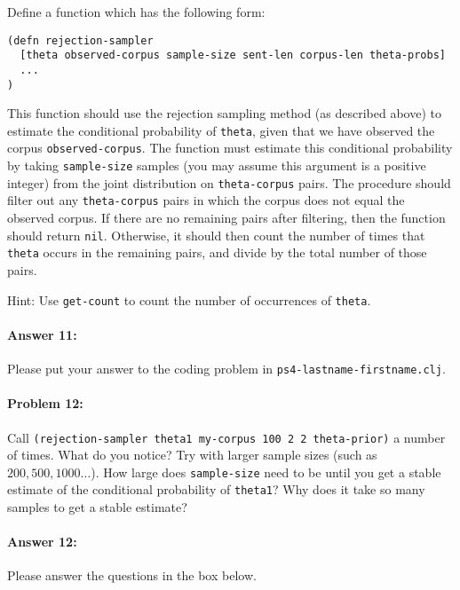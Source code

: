 \documentclass[10pt]{article}
\newcommand{\required}[1]{{\color{blue}{#1}}}
\newcommand{\PSnum}{4}
\begin{document}
 Define a function \required{\texttt{rejection-sampler}}
which has the following form:
 
\begin{lstlisting}
(defn rejection-sampler
  [theta observed-corpus sample-size sent-len corpus-len theta-probs]
  ...
)
\end{lstlisting}

 This function should use the rejection sampling method (as
described above) to estimate the conditional probability of
\texttt{theta}, given that we have observed the corpus
\texttt{observed-corpus}. The function must estimate this conditional
probability by taking \texttt{sample-size} samples (you may assume
this argument is a positive integer) from the joint distribution on
\texttt{theta-corpus} pairs. The procedure should filter out any
\texttt{theta-corpus} pairs in which the corpus does not equal the
observed corpus. If there are no remaining pairs after filtering, then 
the function should return \texttt{nil}. Otherwise,
it should then count the number of times that \texttt{theta} occurs in the remaining pairs,
and divide by the total number of those pairs.

Hint: Use \texttt{get-count} to count the number of occurrences
of \texttt{theta}.

\paragraph{Answer 11:} Please put your answer to the coding problem in
\texttt{ps\PSnum-lastname-firstname.clj}.

\hrulefill %

\paragraph{Problem 12:}

Call \texttt{(rejection-sampler theta1 my-corpus 100 2 2 theta-prior)}
a number of times. What do you notice? Try with larger sample sizes
(such as $200, 500, 1000\ldots$). How large does
\texttt{sample-size} need to be until you get a stable estimate of the
conditional probability of \texttt{theta1}? Why does it take so many
samples to get a stable estimate?

\paragraph{Answer 12:} Please answer the questions in the box below.
\end{document}
